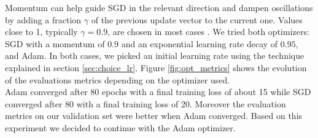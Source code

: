 \documentclass[10pt,conference,compsocconf]{IEEEtran}
\begin{document}
Momentum can help guide SGD in the relevant direction and dampen oscillations by adding a fraction $\gamma$ of the previous update vector to the current one. Values close to 1, typically $\gamma = 0.9$, are chosen in most cases \cite{optimization_algorithms, momentumvalue}. We tried both optimizers: SGD with a momentum of $0.9$ and an exponential learning rate decay of $0.95$, and Adam. In both cases, we picked an initial learning rate using the technique explained in section \ref{sec:choice_lr}. Figure \ref{fig:opt_metrics} shows the evolution of the evaluations metrics depending on the optimizer used. \\

Adam converged after 80 epochs with a final training loss of about 15 while SGD converged after 80 with a final training loss of 20. Moreover the evaluation metrics on our validation set were better when Adam converged. Based on this experiment we decided to continue with the Adam optimizer.

\end{document}
